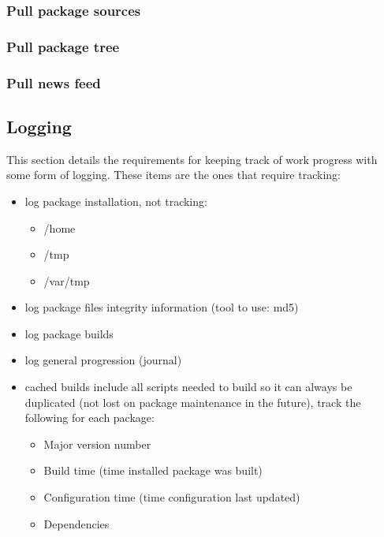 %
%
\subsubsection{Pull package sources}


\subsubsection{Pull package tree}


\subsubsection{Pull news feed}




\newpage
\subsection{Logging}
This section details the requirements for keeping track of work progress
with some form of logging. These items are the ones that require tracking:

\begin{itemize}
  \item log package installation, not tracking:

  \begin{itemize}
    \item /home
    \item /tmp
		\item /var/tmp
  \end{itemize}

  \item log package files integrity information (tool to use: md5)
  \item log package builds
  \item log general progression (journal)
  \item cached builds include all scripts needed to build so it can always be duplicated (not lost on package maintenance in the future), track the following for each package:

\begin{itemize}
  \item Major version number
  \item Build time (time installed package was built)
  \item Configuration time (time configuration last updated)
  \item Dependencies 
\end{itemize}

\end{itemize}

